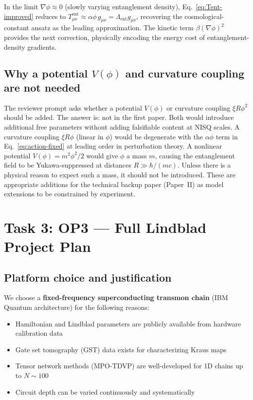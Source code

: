 \documentclass[12pt,letterpaper]{article}
\theoremstyle{plain}
\theoremstyle{definition}
\theoremstyle{remark}
\begin{document}
\begin{improvebox}
In the limit $\nabla\phi \approx 0$ (slowly varying entanglement density), Eq.~\eqref{eq:Tent-improved} reduces to $T^{\mathrm{ent}}_{\mu\nu} \approx \alpha\phi\,g_{\mu\nu} = \Lambda_{\mathrm{ent}}g_{\mu\nu}$, recovering the cosmological-constant ansatz as the leading approximation. The kinetic term $\beta(\nabla\phi)^2$ provides the next correction, physically encoding the energy cost of entanglement-density gradients.
\end{improvebox}

\subsection{Why a potential $V(\phi)$ and curvature coupling are not needed}

The reviewer prompt asks whether a potential $V(\phi)$ or curvature coupling $\xi R\phi^2$ should be added. The answer is: not in the first paper. Both would introduce additional free parameters without adding falsifiable content at NISQ scales. A curvature coupling $\xi R\phi$ (linear in $\phi$) would be degenerate with the $\alpha\phi$ term in Eq.~\eqref{eq:action-fixed} at leading order in perturbation theory. A nonlinear potential $V(\phi) = m^2\phi^2/2$ would give $\phi$ a mass $m$, causing the entanglement field to be Yukawa-suppressed at distances $R \gg \hbar/(mc)$. Unless there is a physical reason to expect such a mass, it should not be introduced. These are appropriate additions for the technical backup paper (Paper~II) as model extensions to be constrained by experiment.

\section{Task 3: OP3 --- Full Lindblad Project Plan}
\label{sec:task3}

\subsection{Platform choice and justification}

We choose a \textbf{fixed-frequency superconducting transmon chain} (IBM Quantum architecture) for the following reasons:
\begin{itemize}
\item Hamiltonian and Lindblad parameters are publicly available from hardware calibration data
\item Gate set tomography (GST) data exists for characterizing Kraus maps
\item Tensor network methods (MPO-TDVP) are well-developed for 1D chains up to $N \sim 100$
\item Circuit depth can be varied continuously and systematically
\end{itemize}
\end{document}
